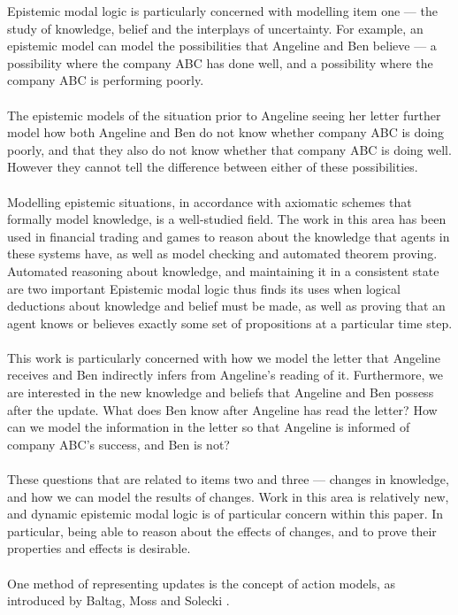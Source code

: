 Epistemic modal logic is particularly concerned with modelling item one --- the study of knowledge,
belief and the interplays of uncertainty.
For example, an epistemic model can model the possibilities that Angeline and Ben believe --- a
possibility where the company ABC has done well, and a possibility where the company ABC is
performing poorly.\\
\\
The epistemic models of the situation prior to Angeline seeing her letter further model how both Angeline
and Ben do not know whether company ABC is doing poorly, and that they also do not know whether
that company ABC is doing well.
However they cannot tell the difference between either of these possibilities.\\
\\
Modelling epistemic situations, in accordance with axiomatic schemes that
formally model knowledge, is a well-studied field.
The work in this area has been used in financial trading and games to reason about the knowledge
that agents in these systems have, as well as model checking and automated theorem proving.
Automated reasoning about knowledge, and maintaining it in a consistent state are two important 
Epistemic modal logic thus finds its uses when logical deductions about knowledge and belief must be
made, as well as proving that an agent knows or believes exactly some set of propositions at a
particular time step.\\
\\
This work is particularly concerned with how we model the letter that Angeline receives and Ben
indirectly infers from Angeline's reading of it.
Furthermore, we are interested in the new knowledge and beliefs that Angeline and Ben possess after the update.
What does Ben know after Angeline has read the letter?
How can we model the information in the letter so that Angeline is informed of company ABC's success,
and Ben is not?\\
\\
These questions that are related to items two and three --- changes in knowledge, and how we can
model the results of changes.
Work in this area is relatively new, and dynamic epistemic modal logic is of particular concern
within this paper.
In particular, being able to reason about the effects of changes, and to prove their properties and
effects is desirable.\\
\\
One method of representing updates is the concept of action models, as
introduced by Baltag, Moss and Solecki \cite{baltag1998lpa}.
